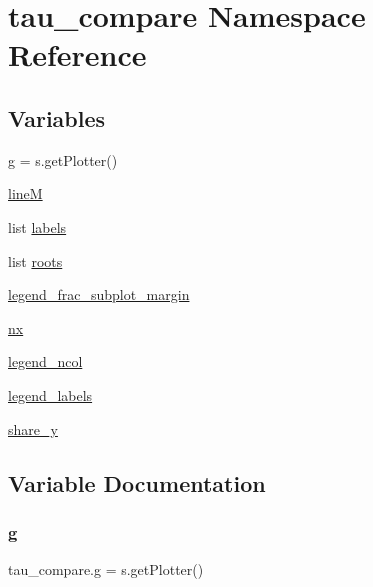 \hypertarget{namespacetau__compare}{}\section{tau\+\_\+compare Namespace Reference}
\label{namespacetau__compare}
\subsection*{Variables}
\begin{DoxyCompactItemize}
\item 
\mbox{\hyperlink{namespacetau__compare_a4e402f405b355552208a15010cf544b5}{g}} = s.\+get\+Plotter()
\item 
\mbox{\hyperlink{namespacetau__compare_aaf608519a9e74ab10200d907d414605b}{lineM}}
\item 
list \mbox{\hyperlink{namespacetau__compare_a8f3cf6ebe12c29b1af17c59179b21ec3}{labels}}
\item 
list \mbox{\hyperlink{namespacetau__compare_a69326ca7ec30f0fa8c8fab5ad340fd72}{roots}}
\item 
\mbox{\hyperlink{namespacetau__compare_acac094c0886b87d8e14b23fbb5c4d35d}{legend\+\_\+frac\+\_\+subplot\+\_\+margin}}
\item 
\mbox{\hyperlink{namespacetau__compare_abd426ddf2ad52463f838a1bde10d9bf4}{nx}}
\item 
\mbox{\hyperlink{namespacetau__compare_a455373e0d7d60800f72b50c70dc0f494}{legend\+\_\+ncol}}
\item 
\mbox{\hyperlink{namespacetau__compare_a50a45e1d6e20bf346dc1f18b49e77ff3}{legend\+\_\+labels}}
\item 
\mbox{\hyperlink{namespacetau__compare_a91a72df96d0ee7e670847f65c2ba816d}{share\+\_\+y}}
\end{DoxyCompactItemize}


\subsection{Variable Documentation}
\mbox{\label{namespacetau__compare_a4e402f405b355552208a15010cf544b5}} 
\subsubsection{\texorpdfstring{g}{g}}
{\footnotesize\ttfamily tau\+\_\+compare.\+g = s.\+get\+Plotter()}


